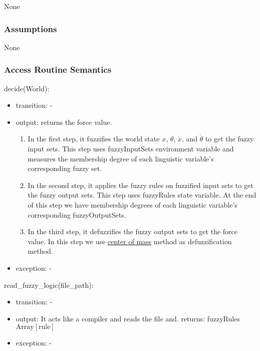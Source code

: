 \documentclass[12pt, titlepage]{article}
\begin{document}
None

\subsubsection{Assumptions}

None

\subsubsection{Access Routine Semantics}

\noindent decide(World):
\begin{itemize}
\item transition: -
\item output: returns the force value.
      \begin{enumerate}
        \item In the first step, it fuzzifies the world state $x$, $\theta$, $\dot{x}$,
        and $\dot{\theta}$ to get the fuzzy input sets. This step uses fuzzyInputSets
        environment variable and measures the membership degree of each linguistic
        variable's corresponding fuzzy set.
        \item In the second step, it applies the fuzzy rules on fuzzified input sets to
        get the fuzzy output sets. This step uses fuzzyRules state variable.
        At the end of this step we have membership degrees of each linguistic 
        variable's corresponding fuzzyOutputSets.
        \item In the third step, it defuzzifies the fuzzy output sets to get the force
        value. In this step we use \href{https://en.wikipedia.org/wiki/Center_of_mass}{center of mass} 
        method as defuzzification method.
      \end{enumerate}
\item exception: -
\end{itemize}

\noindent read\_fuzzy\_logic(file\_path):
\begin{itemize}
\item transition: -
\item output: It acts like a compiler and reads the file and. 
              returns: fuzzyRules $\text{Array}[\text{rule}]$
\item exception: -
\end{itemize}
\end{document}
